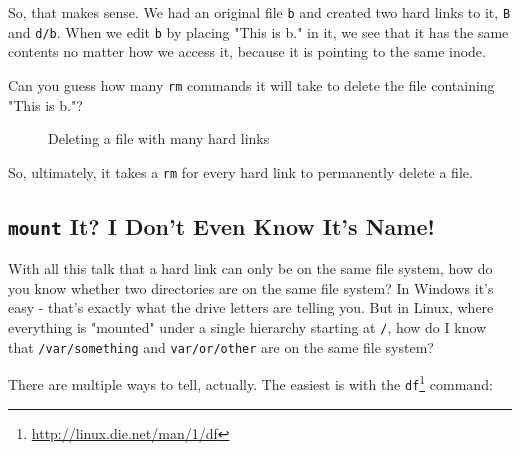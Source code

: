 \documentclass[10pt,american,]{book}
\makeatletter
\newenvironment{Shaded}{\begin{snugshade}}{\end{snugshade}}
\newcommand{\KeywordTok}[1]{\textcolor[rgb]{0.13,0.29,0.53}{\textbf{{#1}}}}
\newcommand{\NormalTok}[1]{{#1}}
\renewcommand{\href}[2]{#2\footnote{\url{#1}}}
\numberwithin{figure}{chapter}
\DeclareRobustCommand{\drcap}[1]{\begin{figure}[H]\caption{#1}\end{figure}}
\DeclareRobustCommand{\drcmd}[1]{\index{Commands!#1@\texttt{#1}}}
\renewcommand{\KeywordTok}[1]{{#1}}
\renewcommand{\NormalTok}[1]{{#1}}
\makeatother
\begin{document}
So, that makes sense. We had an original file \texttt{b} and created two
hard links to it, \texttt{B} and \texttt{d/b}. When we edit \texttt{b}
by placing "This is b." in it, we see that it has the same contents no
matter how we access it, because it is pointing to the same inode.

Can you guess how many \texttt{rm} commands it will take to delete the
file containing "This is b."?

\drcap{Deleting a file with many hard links}

\begin{Shaded}
\end{Shaded}

So, ultimately, it takes a \texttt{rm} for every hard link to
permanently delete a file.

\subsection*{\texorpdfstring{\texttt{mount} It? I Don't Even Know It's
Name!}{mount It? I Don't Even Know It's Name!}}\label{mount-it-i-dont-even-know-its-name}

With all this talk that a hard link can only be on the same file system,
how do you know whether two directories are on the same file system? In
Windows it's easy - that's exactly what the drive letters are telling
you. But in Linux, where everything is "mounted" under a single
hierarchy starting at \texttt{/}, how do I know that
\texttt{/var/something} and \texttt{var/or/other} are on the same file
system?

There are multiple ways to tell, actually. The easiest is with the
\href{http://linux.die.net/man/1/df}{\texttt{df}}\drcmd{df} command:
\end{document}
